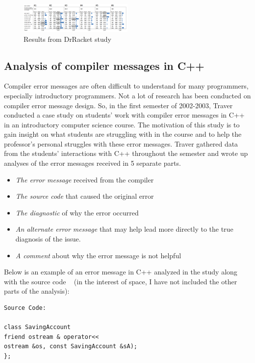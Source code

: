 \documentclass{sig-alternate}
\begin{document}
\begin{figure}[t!]
  \centering
  \includegraphics[keepaspectratio, width=0.5\textwidth]{MEE_Data.png}
  \caption{Results from DrRacket study}
  \label{fig:drracketstudy}
\end{figure}


\subsection{Analysis of compiler messages in C++}
Compiler error messages are often difficult to understand for many programmers, especially introductory programmers. Not a lot of research has been conducted on compiler error message design. So, in the first semester of 2002-2003, Traver conducted a case study on students' work with compiler error messages in C++ in an introductory computer science course. The motivation of this study is to gain insight on what students are struggling with in the course and to help the professor's personal struggles with these error messages. Traver gathered data from the students' interactions with C++ throughout the semester and wrote up analyses of the error messages received in 5 separate parts.
\begin{itemize}
	\item \textit{The error message} received from the compiler
	\item \textit{The source code} that caused the original error
	\item \textit{The diagnostic} of why the error occurred
	\item \textit{An alternate error message} that may help lead more directly to the true diagnosis of the issue.
	\item \textit{A comment} about why the error message is not helpful
\end{itemize}

Below is an example of an error message in C++ analyzed in the study along with the source code ~\cite{Traver:2010} (in the interest of space, I have not included the other parts of the analysis):

\begin{verbatim}
Source Code:

class SavingAccount 
friend ostream & operator<<
ostream &os, const SavingAccount &sA);
};
\end{verbatim}
\end{document}
